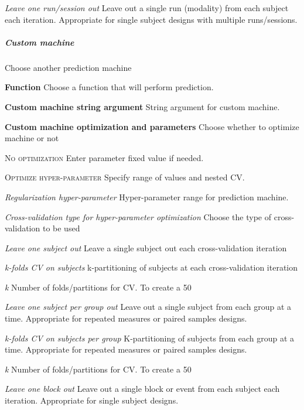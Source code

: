 \textit{Leave one run/session out}
Leave out a single run (modality) from each subject each iteration. Appropriate for single subject designs with multiple runs/sessions.


\subparagraph{Custom machine}
Choose another prediction machine


\textbf{Function}
Choose a function that will perform prediction.


\textbf{Custom machine string argument}
String argument for custom machine.


\textbf{Custom machine optimization and parameters}
Choose whether to optimize machine or not


\textsc{No optimization}
Enter parameter fixed value if needed.


\textsc{Optimize hyper-parameter}
Specify range of values and nested CV.


\textsl{Regularization hyper-parameter}
Hyper-parameter range for prediction machine.


\textsl{Cross-validation type for hyper-parameter optimization}
Choose the type of cross-validation to be used


\textit{Leave one subject out}
Leave a single subject out each cross-validation iteration


\textit{k-folds CV on subjects}
k-partitioning of subjects at each cross-validation iteration


\textit{k}
Number of folds/partitions for CV. To create a 50%


\textit{Leave one subject per group out}
Leave out a single subject from each group at a time. Appropriate for repeated measures or paired samples designs.


\textit{k-folds CV on subjects per group}
K-partitioning of subjects from each group at a time. Appropriate for repeated measures or paired samples designs.


\textit{k}
Number of folds/partitions for CV. To create a 50%


\textit{Leave one block out}
Leave out a single block or event from each subject each iteration. Appropriate for single subject designs.


